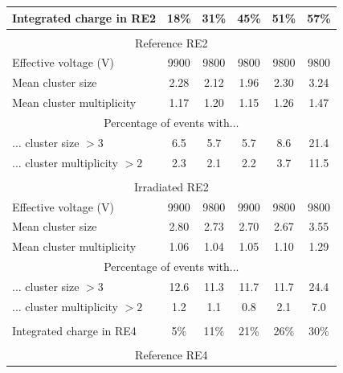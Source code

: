 	\begin{table}[H]
		\centering
		\begin{tabular}{|l|*{5}{c|}}
			\hline
			Integrated charge in RE2      & 18\% & 31\% & 45\% & 51\% & 57\% \\
			\hline
			\multicolumn{6}{c}{}                                             \\
			\hline
			\multicolumn{6}{|c|}{Reference RE2}                              \\
			\hline
			Effective voltage (V)         & 9900 & 9800 & 9800 & 9800 & 9800 \\
			\hline
			Mean cluster size             & 2.28 & 2.12 & 1.96 & 2.30 & 3.24 \\
			\hline
			Mean cluster multiplicity     & 1.17 & 1.20 & 1.15 & 1.26 & 1.47 \\
			\hline
			\multicolumn{6}{|c|}{Percentage of events with...}               \\
			\hline
			... cluster size $>3$         & 6.5  & 5.7  & 5.7  & 8.6  & 21.4 \\
			\hline
			... cluster multiplicity $>2$ & 2.3  & 2.1  & 2.2  & 3.7  & 11.5 \\
			\hline
			\multicolumn{6}{c}{}                                             \\
			\hline
			\multicolumn{6}{|c|}{Irradiated RE2}                             \\
			\hline
			Effective voltage (V)         & 9900 & 9800 & 9900 & 9800 & 9800 \\
			\hline
			Mean cluster size             & 2.80 & 2.73 & 2.70 & 2.67 & 3.55 \\
			\hline
			Mean cluster multiplicity     & 1.06 & 1.04 & 1.05 & 1.10 & 1.29 \\
			\hline
			\multicolumn{6}{|c|}{Percentage of events with...}               \\
			\hline
			... cluster size $>3$         & 12.6 & 11.3 & 11.7 & 11.7 & 24.4 \\
			\hline
			... cluster multiplicity $>2$ & 1.2  & 1.1  & 0.8  & 2.1  & 7.0  \\
			\hline
			\multicolumn{6}{c}{}                                             \\
			\hline
			Integrated charge in RE4      & 5\%  & 11\% & 21\% & 26\% & 30\% \\
			\hline
			\multicolumn{6}{c}{}                                             \\
			\hline
			\multicolumn{6}{|c|}{Reference RE4}                              \\

\end{tabular}
\end{table}
